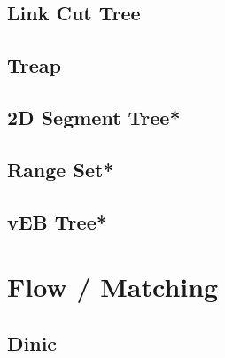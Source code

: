\subsection{Link Cut Tree}

\subsection{Treap}

% 
\subsection{2D Segment Tree*}

% 
% 
\subsection{Range Set*}
\subsection{vEB Tree*}
% 

\section{Flow / Matching}
\subsection{Dinic}

